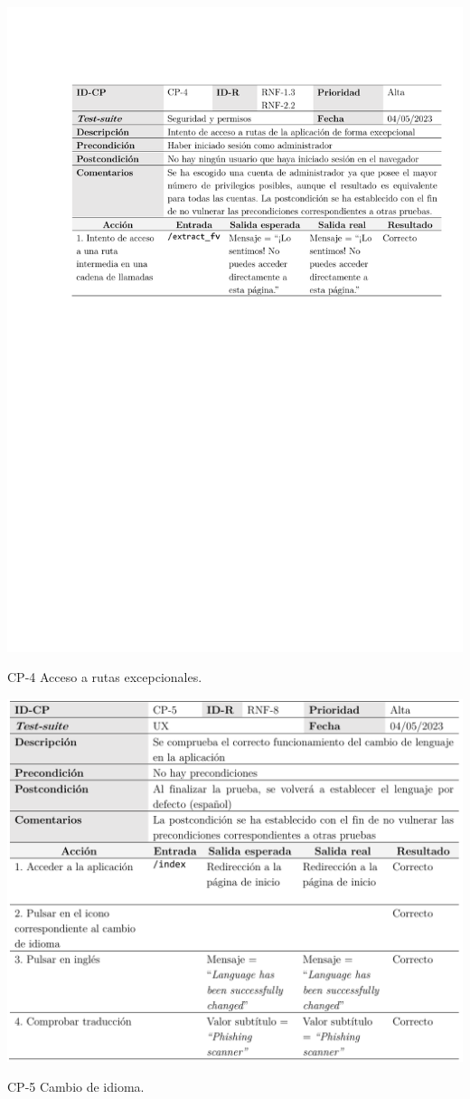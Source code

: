 \begin{table}[p]
	\centering
	\includegraphics[width=\textwidth]{../img/anexos/cp/CP-4}
	\caption{CP-4 Acceso a rutas excepcionales.}
	\label{cp:wrong-stream}
\end{table}

\begin{table}[p]
	\centering
	\includegraphics[width=\textwidth]{../img/anexos/cp/CP-5}
	\caption{CP-5 Cambio de idioma.}
	\label{cp:language}
\end{table}

